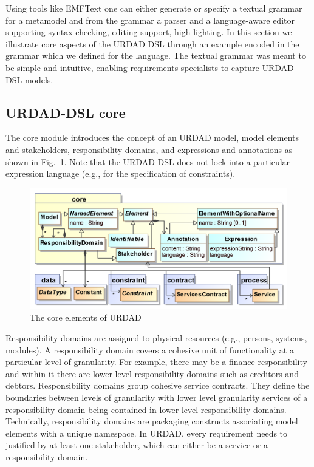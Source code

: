 Using tools like EMFText \cite{heidenreich_derivation_2009} one can either generate or specify a textual grammar for a metamodel and from the grammar a parser and a language-aware editor supporting syntax checking, editing support, high-lighting. In this section we illustrate core aspects of the URDAD DSL through an example encoded in the grammar which we defined for the language. The textual grammar was meant to be simple and intuitive, enabling requirements specialists to capture URDAD DSL models.


\subsection{URDAD-DSL core}

The core module introduces the concept of an URDAD model, model elements and stakeholders, responsibility domains, and expressions and annotations as shown in Fig.\ \ref{fig:metamodel}. Note that the URDAD-DSL does not lock into a particular expression language (e.g., for the specification of constraints). 

\begin{figure}[Htb]
  \centering
  \includegraphics{core}
  \caption{The core elements of URDAD}
  \label{fig:metamodel}
\end{figure}

Responsibility domains are assigned to physical resources (e.g., persons, systems, modules). A responsibility domain covers a cohesive unit of functionality at a particular level of granularity. For example, there may be a finance responsibility and within it there are lower level responsibility domains such as creditors and debtors. Responsibility domains group cohesive service contracts. They define the boundaries between levels of granularity with lower level granularity services of a responsibility domain being contained in lower level responsibility domains. Technically, responsibility domains are packaging constructs associating model elements with a unique namespace. In URDAD, every requirement needs to justified by at least one stakeholder, which can either be a service or a responsibility domain.

